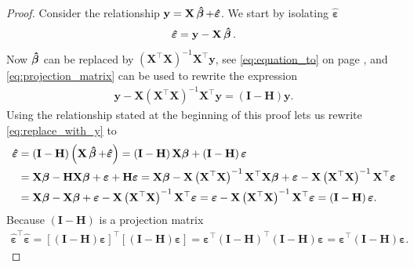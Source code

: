 \begin{proof}
    Consider the relationship $\mathbf{y} = \mathbf{X}\operatorname{\boldsymbol{\hat{\beta}}} + \boldsymbol{\hat{\varepsilon}}$.
    We start by isolating $\boldsymbol{\hat{\varepsilon}}$
    \begin{align*}
        \boldsymbol{\hat{\varepsilon}} = \mathbf{y} - \mathbf{X}\operatorname{\boldsymbol{\hat{\beta}}}.
    \end{align*}
    Now $\operatorname{\boldsymbol{\hat{\beta}}}$ can be replaced by $\left(\mathbf{X}^\top\mathbf{X}\right)^{-1}\mathbf{X}^\top\mathbf{y}$, see \eqref{eq:equation_to} on page \pageref{eq:equation_to}, and \eqref{eq:projection_matrix} can be used to rewrite the expression 
    \begin{align}
        \mathbf{y} - \mathbf{X}\left(\mathbf{X}^\top\mathbf{X}\right)^{-1}\mathbf{X}^\top\mathbf{y}
        = \left(\mathbf{I} - \mathbf{H}\right)\mathbf{y}. \label{eq:replace_with_y}
    \end{align}
    Using the relationship stated at the beginning of this proof lets us rewrite \eqref{eq:replace_with_y} to
    \begin{align*}
        \boldsymbol{\hat{\varepsilon}} &= \left(\mathbf{I} - \mathbf{H}\right)\left(\mathbf{X}\operatorname{\boldsymbol{\hat{\beta}}} + \boldsymbol{\hat{\varepsilon}}\right)
        = \left(\mathbf{I} - \mathbf{H}\right)\mathbf{X}\boldsymbol{\beta} + \left(\mathbf{I} - \mathbf{H}\right)\boldsymbol{\varepsilon} \\
        &= \mathbf{X}\boldsymbol{\beta} - \mathbf{H}\mathbf{X}\boldsymbol{\beta} + \boldsymbol{\varepsilon} + \mathbf{H}\boldsymbol{\varepsilon}
        = \mathbf{X}\boldsymbol{\beta} - \mathbf{X}\left(\mathbf{X}^\top\mathbf{X}\right)^{-1}\mathbf{X}^\top\mathbf{X}\boldsymbol{\beta} + \boldsymbol{\varepsilon} - \mathbf{X}\left(\mathbf{X}^\top\mathbf{X}\right)^{-1}\mathbf{X}^\top\boldsymbol{\varepsilon} \\
        &= \mathbf{X}\boldsymbol{\beta} - \mathbf{X}\boldsymbol{\beta} + \boldsymbol{\varepsilon} - \mathbf{X}\left(\mathbf{X}^\top\mathbf{X}\right)^{-1}\mathbf{X}^\top\boldsymbol{\varepsilon} 
        = \boldsymbol{\varepsilon} - \mathbf{X}\left(\mathbf{X}^\top\mathbf{X}\right)^{-1}\mathbf{X}^\top\boldsymbol{\varepsilon} = \left(\mathbf{I} - \mathbf{H}\right)\boldsymbol{\varepsilon}.
    \end{align*}
    Because $\left(\mathbf{I} - \mathbf{H}\right)$ is a projection matrix
    \begin{align*}
        \boldsymbol{\hat{\varepsilon}}^\top\boldsymbol{\hat{\varepsilon}} = \left[  \left(\mathbf{I} - \mathbf{H}\right)\boldsymbol{\varepsilon} \right]^\top\left[ \left(\mathbf{I} - \mathbf{H}\right)\boldsymbol{\varepsilon} \right] = \boldsymbol{\varepsilon}^\top\left(\mathbf{I} - \mathbf{H}\right)^\top \left(\mathbf{I} - \mathbf{H}\right)\boldsymbol{\varepsilon} = \boldsymbol{\varepsilon}^\top \left(\mathbf{I} - \mathbf{H}\right)\boldsymbol{\varepsilon}.

\end{align*}
\end{proof}
